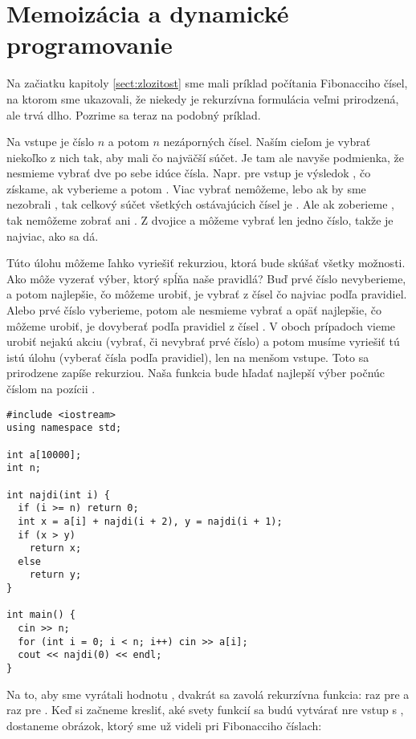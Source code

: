 \chapter{Memoizácia a dynamické programovanie}
\label{sect:dynamika}

Na začiatku kapitoly \ref{sect:zlozitost} sme mali príklad počítania Fibonacciho 
čísel, na ktorom sme ukazovali, že niekedy je rekurzívna formulácia veľmi prirodzená,
ale trvá dlho. Pozrime sa teraz na podobný príklad. 


Na vstupe je číslo $n$ a potom $n$ nezáporných 
čísel. Naším cieľom je vybrať niekoľko z nich tak, aby mali
čo najväčší súčet. Je tam ale navyše podmienka, že nesmieme vybrať dve po sebe idúce čísla.
Napr. pre vstup  je výsledok , čo získame, ak vyberieme  a potom
. Viac vybrať nemôžeme, lebo ak by sme nezobrali , tak celkový súčet všetkých ostávajúcich
čísel je . Ale ak zoberieme , tak nemôžeme zobrať  ani . Z dvojice 
 a  môžeme vybrať len jedno číslo, takže  je najviac, ako sa dá. 


Túto úlohu môžeme ľahko vyriešiť rekurziou, ktorá bude skúšať všetky možnosti. 
Ako môže vyzerať výber, ktorý spĺňa naše pravidlá? Buď prvé číslo 
nevyberieme, a potom
najlepšie, čo môžeme urobiť, je vybrať z čísel  čo najviac
podľa pravidiel.
Alebo prvé číslo  vyberieme, potom ale nesmieme vybrať  a opäť najlepšie,
čo môžeme urobiť, je dovyberať podľa pravidiel z čísel . 
V oboch prípadoch vieme urobiť nejakú akciu (vybrať, či nevybrať prvé číslo) a potom musíme
vyriešiť tú istú úlohu (vyberať čísla podľa pravidiel), len na menšom vstupe. 
Toto sa prirodzene zapíše rekurziou. Naša funkcia  bude hľadať najlepší
výber počnúc číslom na pozícii .

\begin{lstlisting}
#include <iostream>
using namespace std;

int a[10000];
int n;

int najdi(int i) {
  if (i >= n) return 0;
  int x = a[i] + najdi(i + 2), y = najdi(i + 1);
  if (x > y)
    return x;
  else
    return y;
}

int main() {
  cin >> n;
  for (int i = 0; i < n; i++) cin >> a[i];
  cout << najdi(0) << endl;
}

\end{lstlisting}


Na to, aby sme vyrátali hodnotu , dvakrát sa zavolá rekurzívna funkcia:
raz pre  a raz pre . Keď si začneme kresliť, aké svety
funkcií sa budú vytvárať nre vstup s , 
dostaneme obrázok, ktorý sme už videli pri Fibonacciho číslach:

